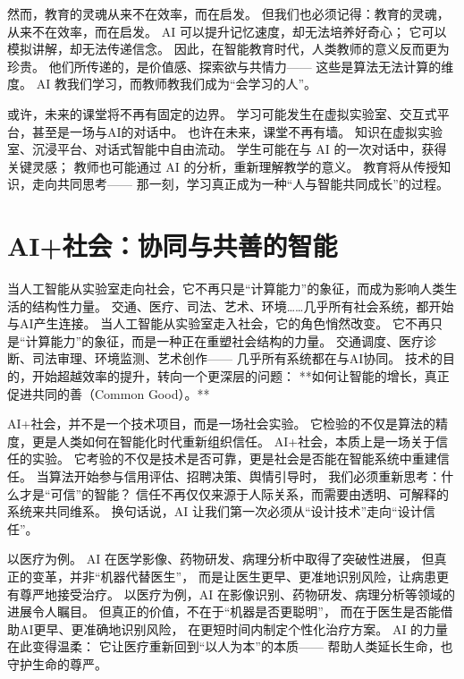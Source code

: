 然而，教育的灵魂从来不在效率，而在启发。  
但我们也必须记得：教育的灵魂，从来不在效率，而在启发。  
AI 可以提升记忆速度，却无法培养好奇心；  
它可以模拟讲解，却无法传递信念。  
因此，在智能教育时代，人类教师的意义反而更为珍贵。  
他们所传递的，是价值感、探索欲与共情力——  
这些是算法无法计算的维度。  
AI 教我们学习，而教师教我们成为“会学习的人”。

或许，未来的课堂将不再有固定的边界。  
学习可能发生在虚拟实验室、交互式平台，甚至是一场与AI的对话中。  
也许在未来，课堂不再有墙。  
知识在虚拟实验室、沉浸平台、对话式智能中自由流动。  
学生可能在与 AI 的一次对话中，获得关键灵感；  
教师也可能通过 AI 的分析，重新理解教学的意义。  
教育将从传授知识，走向共同思考——  
那一刻，学习真正成为一种“人与智能共同成长”的过程。


\section{AI+社会：协同与共善的智能}

当人工智能从实验室走向社会，它不再只是“计算能力”的象征，而成为影响人类生活的结构性力量。  
交通、医疗、司法、艺术、环境……几乎所有社会系统，都开始与AI产生连接。  
当人工智能从实验室走入社会，它的角色悄然改变。  
它不再只是“计算能力”的象征，而是一种正在重塑社会结构的力量。  
交通调度、医疗诊断、司法审理、环境监测、艺术创作——  
几乎所有系统都在与AI协同。  
技术的目的，开始超越效率的提升，转向一个更深层的问题：  
**如何让智能的增长，真正促进共同的善（Common Good）。**

AI+社会，并不是一个技术项目，而是一场社会实验。  
它检验的不仅是算法的精度，更是人类如何在智能化时代重新组织信任。  
AI+社会，本质上是一场关于信任的实验。  
它考验的不仅是技术是否可靠，更是社会是否能在智能系统中重建信任。  
当算法开始参与信用评估、招聘决策、舆情引导时，  
我们必须重新思考：什么才是“可信”的智能？  
信任不再仅仅来源于人际关系，而需要由透明、可解释的系统来共同维系。  
换句话说，AI 让我们第一次必须从“设计技术”走向“设计信任”。

以医疗为例。  
AI 在医学影像、药物研发、病理分析中取得了突破性进展，  
但真正的变革，并非“机器代替医生”，  
而是让医生更早、更准地识别风险，让病患更有尊严地接受治疗。  
以医疗为例，AI 在影像识别、药物研发、病理分析等领域的进展令人瞩目。  
但真正的价值，不在于“机器是否更聪明”，  
而在于医生是否能借助AI更早、更准确地识别风险，  
在更短时间内制定个性化治疗方案。  
AI 的力量在此变得温柔：  
它让医疗重新回到“以人为本”的本质——  
帮助人类延长生命，也守护生命的尊严。

